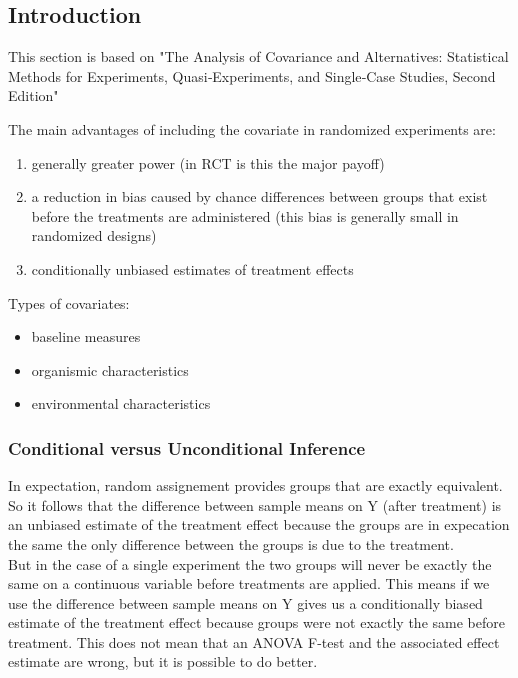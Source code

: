 

\maketitle 
\subsection*{Introduction}
This section is based on "The Analysis of Covariance and Alternatives: Statistical Methods for Experiments, Quasi‐Experiments, and Single‐Case Studies, Second Edition"

The main advantages of including the covariate in randomized experiments are: 
\begin{enumerate}
  \item generally greater power (in RCT is this the major payoff)
  \item a reduction in bias caused by chance differences between groups that exist before the treatments are administered (this bias is generally small in randomized designs) 
  \item conditionally unbiased estimates of treatment effects 
\end{enumerate}

Types of covariates: 
\begin{itemize}
  \item baseline measures 
  \item organismic characteristics 
  \item environmental characteristics 
\end{itemize}

\subsubsection*{Conditional versus Unconditional Inference}
In expectation, random assignement provides groups that are exactly equivalent. So it follows that the difference between sample  means on Y (after treatment) is an unbiased estimate of the treatment effect because the groups are in expecation the same the only difference between the groups is due to the treatment.\\

But in the case of a single experiment the two groups will never be exactly the same on a continuous variable before treatments are applied. This means if we use the difference between sample means on Y gives us a conditionally biased estimate of the treatment effect because groups were not exactly the same before treatment. This does not mean that an ANOVA F-test and the associated effect estimate are wrong, but it is possible to do better.

